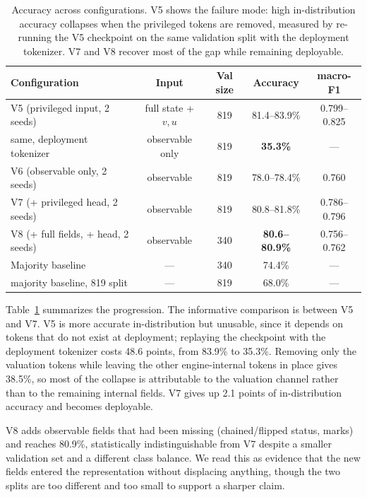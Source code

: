 \documentclass[11pt]{article}
\begin{document}
\begin{table}[t]
\centering
\small
\begin{tabular}{@{}lcccc@{}}
\toprule
\textbf{Configuration} & \textbf{Input} & \textbf{Val size} & \textbf{Accuracy} & \textbf{macro-F1} \\
\midrule
V5 (privileged input, 2 seeds) & full state + $v,u$ & 819 & 81.4--83.9\% & 0.799--0.825 \\
\quad same, deployment tokenizer & observable only & 819 & \textbf{35.3\%} & --- \\
\midrule
V6 (observable only, 2 seeds) & observable & 819 & 78.0--78.4\% & 0.760 \\
V7 (+ privileged head, 2 seeds) & observable & 819 & 80.8--81.8\% & 0.786--0.796 \\
V8 (+ full fields, + head, 2 seeds) & observable & 340 & \textbf{80.6--80.9\%} & 0.756--0.762 \\
\midrule
Majority baseline & --- & 340 & 74.4\% & --- \\
\quad majority baseline, 819 split & --- & 819 & 68.0\% & --- \\
\bottomrule
\end{tabular}
\caption{Accuracy across configurations. V5 shows the failure mode: high in-distribution
accuracy collapses when the privileged tokens are removed, measured by re-running the V5
checkpoint on the same validation split with the deployment tokenizer. V7 and V8 recover
most of the gap while remaining deployable.}
\label{tab:main}
\end{table}

Table~\ref{tab:main} summarizes the progression. The informative comparison is between V5
and V7. V5 is more accurate in-distribution but unusable, since it depends on tokens that do
not exist at deployment; replaying the checkpoint with the deployment tokenizer costs 48.6
points, from 83.9\% to 35.3\%. Removing only the valuation tokens while leaving the other
engine-internal tokens in place gives 38.5\%, so most of the collapse is attributable to the
valuation channel rather than to the remaining internal fields. V7 gives up 2.1 points of
in-distribution accuracy and becomes deployable.

V8 adds observable fields that had been missing (chained/flipped status, marks) and reaches
80.9\%, statistically indistinguishable from V7 despite a smaller validation set and a
different class balance. We read this as evidence that the new fields entered the
representation without displacing anything, though the two splits are too different and too
small to support a sharper claim.
\end{document}
